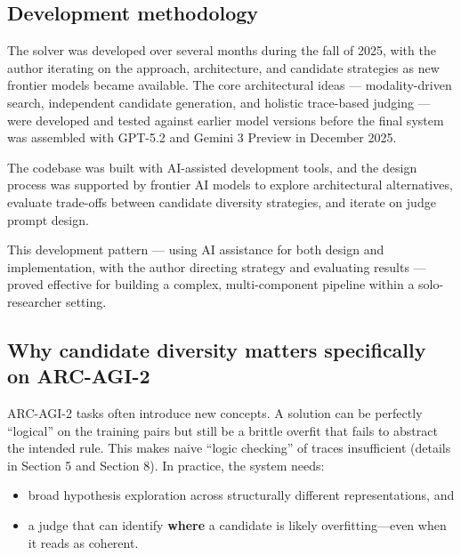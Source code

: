 \documentclass[11pt]{article}
\providecommand{\tightlist}{%
  \setlength{\itemsep}{0pt}\setlength{\parskip}{0pt}}
\begin{document}
\hypertarget{development-methodology}{%
\subsection{Development methodology}\label{development-methodology}}

The solver was developed over several months during the fall of 2025,
with the author iterating on the approach, architecture, and candidate
strategies as new frontier models became available. The core
architectural ideas --- modality-driven search, independent candidate
generation, and holistic trace-based judging --- were developed and
tested against earlier model versions before the final system was
assembled with GPT-5.2 and Gemini 3 Preview in December 2025.

The codebase was built with AI-assisted development tools, and the
design process was supported by frontier AI models to explore
architectural alternatives, evaluate trade-offs between candidate
diversity strategies, and iterate on judge prompt design.

This development pattern --- using AI assistance for both design and
implementation, with the author directing strategy and evaluating
results --- proved effective for building a complex, multi-component
pipeline within a solo-researcher setting.

\hypertarget{why-candidate-diversity-matters-specifically-on-arc-agi-2}{%
\subsection{Why candidate diversity matters specifically on
ARC-AGI-2}\label{why-candidate-diversity-matters-specifically-on-arc-agi-2}}

ARC-AGI-2 tasks often introduce new concepts. A solution can be
perfectly ``logical'' on the training pairs but still be a brittle
overfit that fails to abstract the intended rule. This makes naive
``logic checking'' of traces insufficient (details in Section 5 and
Section 8). In practice, the system needs:

\begin{itemize}
\tightlist
\item
  broad hypothesis exploration across structurally different
  representations, and
\item
  a judge that can identify \textbf{where} a candidate is likely
  overfitting---even when it reads as coherent.
\end{itemize}
\end{document}
